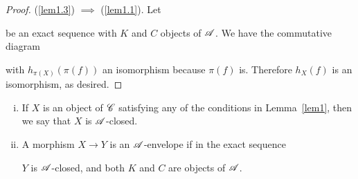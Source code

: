\documentclass[10pt]{amsart}
\begin{document}
\begin{lem}
\begin{proof}
    (\ref{lem1.3}) $\implies$ (\ref{lem1.1}).  Let
    \begin{center}
    \end{center}
    be an exact sequence with $K$ and $C$ objects of $\mathscr{A}$.
    We have the commutative diagram
    \begin{center}
    \end{center}
    with $h_{\pi(X)}(\pi(f))$ an isomorphism because $\pi(f)$ is.
    Therefore $h_X(f)$ is an isomorphism, as desired.
  \end{proof}
\end{lem}

\begin{defn}
  \begin{enumerate}[(i)]
  \item
    If $X$ is an object of $\mathscr{C}$ satisfying any of the conditions in Lemma~\ref{lem1}, then we say that $X$ is $\mathscr{A}$-closed.
  \item
    A morphism $X \rightarrow Y$ is an $\mathscr{A}$-envelope if in the exact sequence
    \begin{center}
    \end{center}
    $Y$ is $\mathscr{A}$-closed, and both $K$ and $C$ are objects of $\mathscr{A}$.
  \end{enumerate}
\end{defn}
\end{document}
